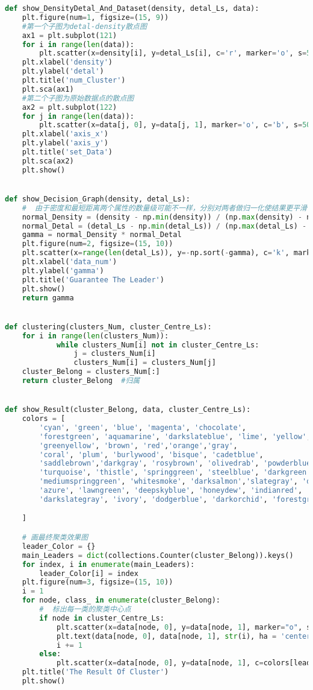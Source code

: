 \begin{lstlisting}[language=python]
def show_DensityDetal_And_Dataset(density, detal_Ls, data):
    plt.figure(num=1, figsize=(15, 9))
    #第一个子图为detal-density散点图
    ax1 = plt.subplot(121)
    for i in range(len(data)):
        plt.scatter(x=density[i], y=detal_Ls[i], c='r', marker='o', s=50)
    plt.xlabel('density')
    plt.ylabel('detal')
    plt.title('num_Cluster')
    plt.sca(ax1)
    #第二个子图为原始数据点的散点图
    ax2 = plt.subplot(122)
    for j in range(len(data)):
        plt.scatter(x=data[j, 0], y=data[j, 1], marker='o', c='b', s=50)
    plt.xlabel('axis_x')
    plt.ylabel('axis_y')
    plt.title('set_Data')
    plt.sca(ax2)
    plt.show()


def show_Decision_Graph(density, detal_Ls):
    #  由于密度和最短距离两个属性的数量级可能不一样，分别对两者做归一化使结果更平滑
    normal_Density = (density - np.min(density)) / (np.max(density) - np.min(density))
    normal_Detal = (detal_Ls - np.min(detal_Ls)) / (np.max(detal_Ls) - np.min(detal_Ls))
    gamma = normal_Density * normal_Detal
    plt.figure(num=2, figsize=(15, 10))
    plt.scatter(x=range(len(detal_Ls)), y=-np.sort(-gamma), c='k', marker='o', s=-np.sort(-gamma) * 100)
    plt.xlabel('data_num')
    plt.ylabel('gamma')
    plt.title('Guarantee The Leader')
    plt.show()
    return gamma


def clustering(clusters_Num, cluster_Centre_Ls):
    for i in range(len(clusters_Num)):
            while clusters_Num[i] not in cluster_Centre_Ls:
                j = clusters_Num[i]
                clusters_Num[i] = clusters_Num[j]
    cluster_Belong = clusters_Num[:]
    return cluster_Belong  #归属


def show_Result(cluster_Belong, data, cluster_Centre_Ls):
    colors = [
        'cyan', 'green', 'blue', 'magenta', 'chocolate',
        'forestgreen', 'aquamarine', 'darkslateblue', 'lime', 'yellow',
        'greenyellow', 'brown', 'red','orange','gray',
        'coral', 'plum', 'burlywood', 'bisque', 'cadetblue',
        'saddlebrown','darkgray', 'rosybrown', 'olivedrab', 'powderblue',
        'turquoise', 'thistle', 'springgreen', 'steelblue', 'darkgreen',
        'mediumspringgreen', 'whitesmoke', 'darksalmon','slategray', 'darkseagreen',
        'azure', 'lawngreen', 'deepskyblue', 'honeydew', 'indianred',
        'darkslategray', 'ivory', 'dodgerblue', 'darkorchid', 'forestgreenblack',

    ]

    # 画最终聚类效果图
    leader_Color = {}
    main_Leaders = dict(collections.Counter(cluster_Belong)).keys()
    for index, i in enumerate(main_Leaders):
        leader_Color[i] = index
    plt.figure(num=3, figsize=(15, 10))
    i = 1
    for node, class_ in enumerate(cluster_Belong):
        #  标出每一类的聚类中心点
        if node in cluster_Centre_Ls:
            plt.scatter(x=data[node, 0], y=data[node, 1], marker="o", s=100, c='r')
            plt.text(data[node, 0], data[node, 1], str(i), ha = 'center',fontsize=15,c='K')
            i += 1
        else:
            plt.scatter(x=data[node, 0], y=data[node, 1], c=colors[leader_Color[class_]], marker='o', s=100)
    plt.title('The Result Of Cluster')
    plt.show()



\end{lstlisting}
